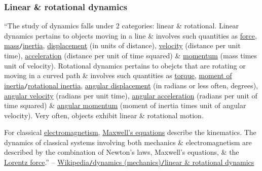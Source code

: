 \documentclass{article}
\begin{document}
\subsubsection{Linear \& rotational dynamics}
``The study of dynamics falls under 2 categories: linear \& rotational. Linear dynamics pertains to objects moving in a line \& involves such quantities as \href{https://en.wikipedia.org/wiki/Force}{force}, \href{https://en.wikipedia.org/wiki/Mass}{mass}{\tt/}\href{https://en.wikipedia.org/wiki/Inertia#Mass_and_inertia}{inertia}, \href{https://en.wikipedia.org/wiki/Displacement_(vector)}{displacement} (in units of distance), \href{https://en.wikipedia.org/wiki/Velocity}{velocity} (distance per unit time), \href{https://en.wikipedia.org/wiki/Acceleration}{acceleration} (distance per unit of time squared) \& \href{https://en.wikipedia.org/wiki/Momentum}{momentum} (mass times unit of velocity). Rotational dynamics pertains to obejcts that are rotating or moving in a curved path \& involves such quantities as \href{https://en.wikipedia.org/wiki/Torque}{torque}, \href{https://en.wikipedia.org/wiki/Moment_of_inertia}{moment of inertia}{\tt/}\href{https://en.wikipedia.org/wiki/Rotational_inertia}{rotational inertia}, \href{https://en.wikipedia.org/wiki/Angular_displacement}{angular displacement} (in radians or less often, degrees), \href{https://en.wikipedia.org/wiki/Angular_velocity}{angular velocity} (radians per unit time), \href{https://en.wikipedia.org/wiki/Angular_acceleration}{angular acceleration} (radians per unit of time squared) \& \href{https://en.wikipedia.org/wiki/Angular_momentum}{angular momentum} (moment of inertia times unit of angular velocity). Very often, objects exhibit linear \& rotational motion.

For classical \href{https://en.wikipedia.org/wiki/Electromagnetism}{electromagnetism}, \href{https://en.wikipedia.org/wiki/Maxwell%27s_equations}{Maxwell's equations} describe the kinematics. The dynamics of classical systems involving both mechanics \& electromagnetism are described by the combination of Newton's laws, Maxwell's equations, \& the \href{https://en.wikipedia.org/wiki/Lorentz_force}{Lorentz force}.'' -- \href{https://en.wikipedia.org/wiki/Dynamics_(mechanics)#Linear_and_rotational_dynamics}{Wikipedia{\tt/}dynamics (mechanics){\tt/}linear \& rotational dynamics}
\end{document}
